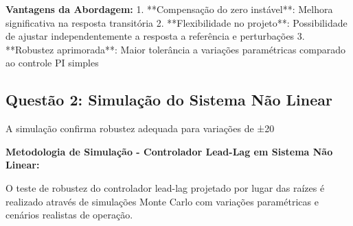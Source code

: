 \documentclass[a4paper,12pt]{article}
\begin{document}
\textbf{Vantagens da Abordagem:}
1. **Compensação do zero instável**: Melhora significativa na resposta transitória
2. **Flexibilidade no projeto**: Possibilidade de ajustar independentemente a resposta a referência e perturbações
3. **Robustez aprimorada**: Maior tolerância a variações paramétricas comparado ao controle PI simples

\subsection{Questão 2: Simulação do Sistema Não Linear}

A simulação confirma robustez adequada para variações de ±20%

\textbf{Metodologia de Simulação - Controlador Lead-Lag em Sistema Não Linear:}

O teste de robustez do controlador lead-lag projetado por lugar das raízes é realizado através de simulações Monte Carlo com variações paramétricas e cenários realistas de operação.
\end{document}
